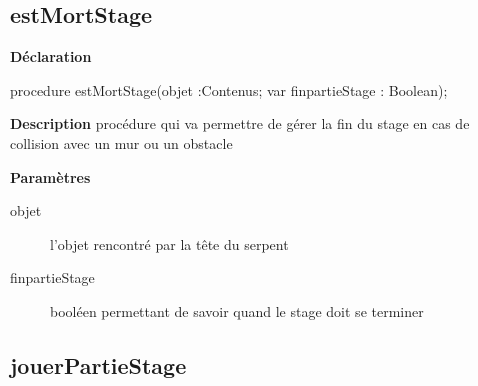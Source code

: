 \documentclass{report}
\newif\ifpdf
\begin{document}
\subsection*{estMortStage}
\fi
\label{Stage-estMortStage}
\begin{list}{}{
\setlength{\itemindent}{0cm}
\setlength{\listparindent}{0cm}
\setlength{\leftmargin}{\evensidemargin}
\addtolength{\leftmargin}{\tmplength}
\settowidth{\labelsep}{X}
\addtolength{\leftmargin}{\labelsep}
\setlength{\labelwidth}{\tmplength}
}
\item[\textbf{Déclaration}\hfill]
\ifpdf
\begin{flushleft}
\fi
\begin{ttfamily}
procedure estMortStage(objet :Contenus; var finpartieStage : Boolean);\end{ttfamily}

\ifpdf
\end{flushleft}
\fi

\par
\item[\textbf{Description}]
procédure qui va permettre de gérer la fin du stage en cas de collision avec un mur ou un obstacle  \par
\item[\textbf{Paramètres}]
\begin{description}
\item[objet] l'objet rencontré par la tête du serpent
\item[finpartieStage] booléen permettant de savoir quand le stage doit se terminer
\end{description}


\end{list}
\ifpdf
\subsection*{\large{\textbf{jouerPartieStage}}\normalsize\hspace{1ex}\hrulefill}
\else
\end{document}
